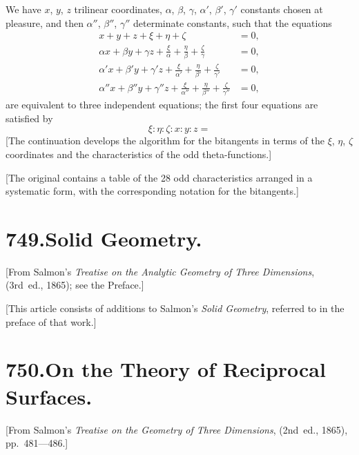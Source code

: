 \documentclass[12pt,a4paper]{article}
\begin{document}
We have $x$, $y$, $z$ trilinear coordinates, $\alpha$, $\beta$, $\gamma$, $\alpha'$, $\beta'$, $\gamma'$ constants chosen at pleasure, and then $\alpha''$, $\beta''$, $\gamma''$ determinate constants, such that the equations
\begin{align*}
x + y + z + \xi + \eta + \zeta &= 0, \\
\alpha x + \beta y + \gamma z + \frac{\xi}{\alpha} + \frac{\eta}{\beta} + \frac{\zeta}{\gamma} &= 0, \\
\alpha' x + \beta' y + \gamma' z + \frac{\xi}{\alpha'} + \frac{\eta}{\beta'} + \frac{\zeta}{\gamma'} &= 0, \\
\alpha'' x + \beta'' y + \gamma'' z + \frac{\xi}{\alpha''} + \frac{\eta}{\beta''} + \frac{\zeta}{\gamma''} &= 0,
\end{align*}
are equivalent to three independent equations; the first four equations are satisfied by
\[
\xi : \eta : \zeta : x : y : z =
\]
[The continuation develops the algorithm for the bitangents in terms of the $\xi$, $\eta$, $\zeta$ coordinates and the characteristics of the odd theta-functions.]

\medskip

[The original contains a table of the 28 odd characteristics arranged in a systematic form, with the corresponding notation for the bitangents.]


\newpage
\section*{\textbf{749.}\quad Solid Geometry.}

[From Salmon's \textit{Treatise on the Analytic Geometry of Three Dimensions}, (3rd~ed., 1865); see the Preface.]

\medskip

[This article consists of additions to Salmon's \textit{Solid Geometry}, referred to in the preface of that work.]


\newpage
\section*{\textbf{750.}\quad On the Theory of Reciprocal Surfaces.}

[From Salmon's \textit{Treatise on the Geometry of Three Dimensions}, (2nd~ed., 1865), pp.~481---486.]

\medskip
\end{document}
